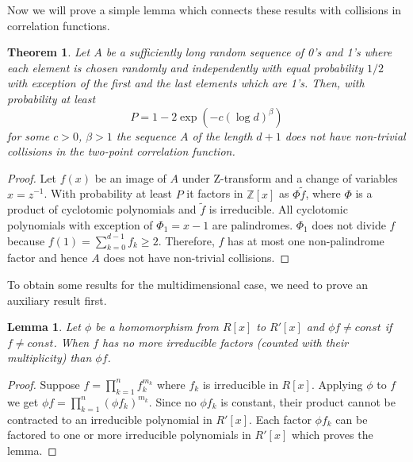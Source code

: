 \documentclass[12pt, a4paper]{article}
\newtheorem{theorem}{Theorem}
\newtheorem{lemma}{Lemma}
\begin{document}
Now we will prove a simple lemma which connects these results with collisions in
correlation functions.
\begin{theorem}
  \label{the:sequence}
  Let $A$ be a sufficiently long random sequence of 0's and 1's where each
  element is chosen randomly and independently with equal probability $1/2$ with
  exception of the first and the last elements which are 1's. Then, with
  probability at least
  \begin{equation*}
    P = 1 - 2\exp(-c(\log d)^\beta)
  \end{equation*}
  for some $c > 0$, $\beta > 1$ the sequence $A$ of the length $d+1$ does not
  have non-trivial collisions in the two-point correlation function.
\end{theorem}
\begin{proof}
  Let $f(x)$ be an image of $A$ under Z-transform and a change of variables
  $x = z^{-1}$. With probability at least $P$ it factors in $\mathbb{Z}[x]$ as
  $\Phi \tilde{f}$, where $\Phi$ is a product of cyclotomic polynomials and
  $\tilde{f}$ is irreducible. All cyclotomic polynomials with exception of
  $\Phi_1 = x - 1$ are palindromes. $\Phi_1$ does not divide $f$ because
  $f(1) = \sum\limits_{k=0}^{d-1} f_k \ge 2$. Therefore, $f$ has at most one
  non-palindrome factor and hence $A$ does not have non-trivial collisions.
\end{proof}

To obtain some results for the multidimensional case, we need to prove an
auxiliary result first.
\begin{lemma}
  \label{lem:factors}
  Let $\phi$ be a homomorphism from $R[x]$ to $R'[x]$ and $\phi f \ne const$ if
  $f \ne const$. When $f$ has no more irreducible factors (counted with their
  multiplicity) than $\phi f$.
\end{lemma}
\begin{proof}
  Suppose $f = \prod_{k=1}^n f_k^{m_k}$ where $f_k$ is irreducible in
  $R[x]$. Applying $\phi$ to $f$ we get $\phi f = \prod_{k=1}^n (\phi f_k)^{m_k}$.
  Since no $\phi f_k$ is constant, their product cannot be contracted to an
  irreducible polynomial in $R'[x]$. Each factor $\phi f_k$ can be factored to
  one or more irreducible polynomials in $R'[x]$ which proves the lemma.
\end{proof}
\end{document}
